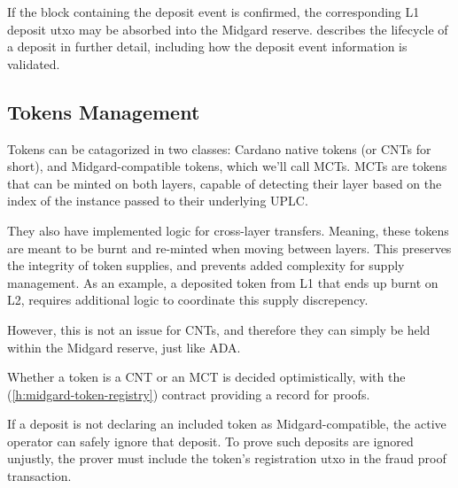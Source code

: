 \documentclass[../midgard.tex]{subfiles}
\begin{document}
If the block containing the deposit event is confirmed, the corresponding L1 deposit utxo may be absorbed into the Midgard reserve.
 describes the lifecycle of a deposit in further detail, including how the deposit event information is validated.

\subsection{Tokens Management}
\label{h:tokens-management}

Tokens can be catagorized in two classes: Cardano native tokens (or CNTs for short), and Midgard-compatible tokens, which we'll call MCTs.
MCTs are tokens that can be minted on both layers, capable of detecting their layer based on the index of the  instance passed to their underlying UPLC.

They also have implemented logic for cross-layer transfers. Meaning, these tokens are meant to be burnt and re-minted when moving between layers.
This preserves the integrity of token supplies, and prevents added complexity for supply management.
As an example, a deposited token from L1 that ends up burnt on L2, requires additional logic to coordinate this supply discrepency.

However, this is not an issue for CNTs, and therefore they can simply be held within the Midgard reserve, just like ADA.

Whether a token is a CNT or an MCT is decided optimistically, with the  (\cref{h:midgard-token-registry}) contract providing a record for proofs.

If a deposit is not declaring an included token as Midgard-compatible, the active operator can safely ignore that deposit.
To prove such deposits are ignored unjustly, the prover must include the token's registration utxo in the fraud proof transaction.
\end{document}
